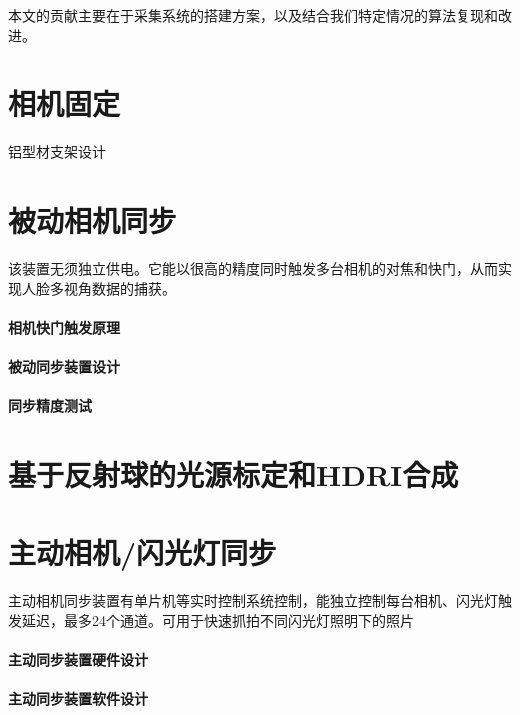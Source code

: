 \documentclass{scutmaster}
\begin{document}
本文的贡献主要在于采集系统的搭建方案，以及结合我们特定情况的算法复现和改进。

\section{相机固定}

铝型材支架设计

\section{被动相机同步}
\label{sec:passive_sync}

该装置无须独立供电。它能以很高的精度同时触发多台相机的对焦和快门，从而实现人脸多视角数据的捕获。

\paragraph{相机快门触发原理}

\paragraph{被动同步装置设计}

\paragraph{同步精度测试}



\section{基于反射球的光源标定和HDRI合成}

\section{主动相机/闪光灯同步}

主动相机同步装置有单片机等实时控制系统控制，能独立控制每台相机、闪光灯触发延迟，最多24个通道。可用于快速抓拍不同闪光灯照明下的照片

\paragraph{主动同步装置硬件设计}

\paragraph{主动同步装置软件设计}
\end{document}
